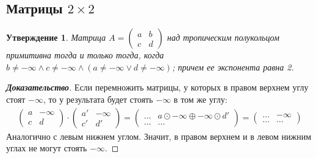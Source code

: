 \documentclass[12pt]{article}
\newtheorem{proposition}[theorem]{Утверждение}
\begin{document}
\subsection{Матрицы $2\times2$}
\begin{proposition}
Матрица $A = \begin{pmatrix}
a & b \\
c & d
\end{pmatrix}$ над тропическим полукольцом примитивна тогда и только тогда, когда $b \neq -\infty \wedge c \neq -\infty \wedge (a \neq -\infty \vee d \neq -\infty)$; причем ее экспонента равна 2.
\end{proposition}
\begin{proof}[\textbf{Доказательство}]
Если перемножить матрицы, у которых в правом верхнем углу стоят $-\infty$, то у результата будет стоять $-\infty$ в том же углу:
\begin{multline*}
\begin{pmatrix}
a & -\infty \\
c & d
\end{pmatrix} \cdot \begin{pmatrix}
a' & -\infty \\
c' & d'
\end{pmatrix} = \begin{pmatrix}
\dots & a \odot -\infty \oplus -\infty \odot d' \\
\dots & \dots
\end{pmatrix} = \begin{pmatrix}
\dots & -\infty \\
\dots & \dots
\end{pmatrix}
\end{multline*}
Аналогично с левым нижнем углом. Значит, в правом верхнем и в левом нижним углах не могут стоять $-\infty$.


\end{proof}
\end{document}
